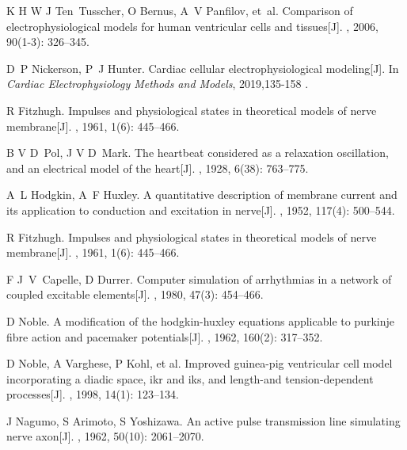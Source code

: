 \documentclass[twoside,UTF8]{nputhesis}
\begin{document}
\begin{thebibliography}{99}
	K H W J Ten~Tusscher, O Bernus, A~V Panfilov, et~al.
	\newblock Comparison of electrophysiological models for human ventricular cells
	and tissues[J].
	, 2006, 90(1-3): 326--345.
	
	D~P Nickerson, P~J Hunter.
	\newblock Cardiac cellular electrophysiological modeling[J].
	\newblock In {\em Cardiac Electrophysiology Methods and Models},  
	2019,135-158 .
	
	R Fitzhugh.
	\newblock Impulses and physiological states in theoretical models of nerve
	membrane[J].
	, 1961, 1(6): 445--466.
	
	
	B V D~Pol, J V D~Mark.
	\newblock The heartbeat considered as a relaxation oscillation, and an
	electrical model of the heart[J].
	, 1928, 6(38): 763--775.
	
	A~L Hodgkin, A~F Huxley.
	\newblock A quantitative description of membrane current and its application to
	conduction and excitation in nerve[J].
	, 1952, 117(4): 500--544.
	
	
	R Fitzhugh.
	\newblock Impulses and physiological states in theoretical models of nerve
	membrane[J].
	, 1961, 1(6): 445--466.
	
	F J~V~Capelle, D Durrer.
	\newblock Computer simulation of arrhythmias in a network of coupled excitable
	elements[J].
	, 1980, 47(3): 454--466.
	
	D Noble.
	\newblock A modification of the hodgkin-huxley equations applicable to
	purkinje fibre action and pacemaker potentials[J].
	, 1962, 160(2): 317--352.
	
	D Noble, A Varghese, P Kohl, et al.
	\newblock Improved guinea-pig ventricular cell model incorporating a diadic
	space, ikr and iks, and length-and tension-dependent processes[J].
	, 1998, 14(1): 123--134.
	
	J Nagumo, S Arimoto, S Yoshizawa.
	\newblock An active pulse transmission line simulating nerve axon[J].
	, 1962, 50(10): 2061--2070.
	

\end{thebibliography}
\end{document}
